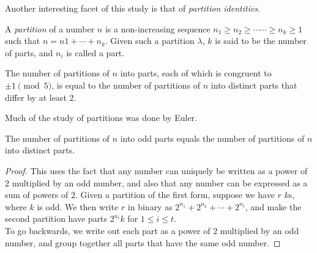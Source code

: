 	Another interesting facet of this study is that of \emph{partition identities}.

	\begin{fdef}
		A \emph{partition} of a number $n$ is a non-increasing sequence $n_1 \ge n_2 \ge \cdots \cdots \ge n_k \ge 1$ such that $n = n1 + \cdots + n_k$. Given such a partition $\lambda$, $k$ is said to be the number of parts, and $n_i$ is called a part.
	\end{fdef}

	\begin{ftheo}
		The number of partitions of $n$ into parts, each of which is congruent to $\pm1 \pmod{5}$, is equal to the number of partitions of $n$ into distinct parts that differ by at least $2$.
	\end{ftheo}

	Much of the study of partitions was done by Euler.

	\begin{ftheo}[Euler]
		The number of partitions of $n$ into odd parts equals the number of partitions of $n$ into distinct parts.
	\end{ftheo}
	\begin{proof}
		This uses the fact that any number can uniquely be written as a power of $2$ multiplied by an odd number, and also that any number can be expressed as a sum of powers of $2$. Given a partition of the first form, suppose we have $r$ $k$s, where $k$ is odd. We then write $r$ in binary as $2^{n_1} + 2^{n_2} + \cdots + 2^{n_t}$, and make the second partition have parts $2^{n_i}k$ for $1 \le i \le t$.\\
		To go backwards, we write out each part as a power of $2$ multiplied by an odd number, and group together all parts that have the same odd number.
	\end{proof}


